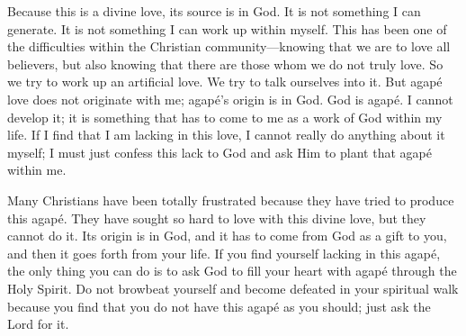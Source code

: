 Because this is a divine love, its source is in God. It is not 
something I can generate. It is not something I can work up 
within myself. This has been one of the difficulties within 
the Christian community—knowing that we are to love all 
believers, but also knowing that there are those whom we 
do not truly love. So we try to work up an artificial love. 
We try to talk ourselves into it. But agapé love does not 
originate with me; agapé’s origin is in God. God is agapé. I 
cannot develop it; it is something that has to come to me as 
a work of God within my life. If I find that I am lacking in 
this love, I cannot really do anything about it myself; I must 
just confess this lack to God and ask Him to plant that agapé 
within me.

Many Christians have been totally frustrated because 
they have tried to produce this agapé. They have sought so 
hard to love with this divine love, but they cannot do it. 
Its origin is in God, and it has to come from God as a gift 
to you, and then it goes forth from your life. If you find 
yourself lacking in this agapé, the only thing you can do is 
to ask God to fill your heart with agapé through the Holy 
Spirit. Do not browbeat yourself and become defeated in 
your spiritual walk because you find that you do not have 
this agapé as you should; just ask the Lord for it.


